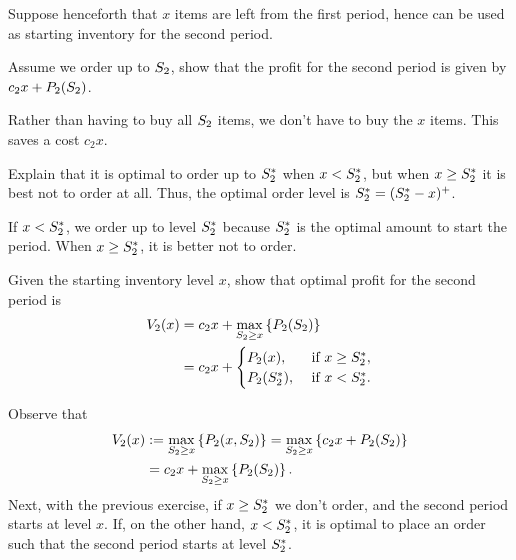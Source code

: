 Suppose henceforth that $x$ items are left from the first period, hence can be used as starting inventory for the second period.
  
\begin{exercise}
Assume we order up to $S_2$,  show that the profit for the second period is given by
$c_2 x + P_2(S_2)$.
\begin{solution}
Rather than having to buy all $S_2$ items, we don't have to buy the $x$ items. This saves a cost $c_2 x$. 
\end{solution}
\end{exercise}

\begin{exercise}
Explain that it is optimal to order up to $S_2^*$ when $x<S_2^*$, but when $x\geq 
S_2^*$ it is best not to order at all. Thus, the optimal order level is $S_2^* = (S_2^* - x)^+$.  
\begin{solution}
If $x<S_2^*$, we order up to level $S_2^*$ because $S_2^*$ is the optimal amount to start the period. When $x\geq S_2^*$, it is better not to order. 
\end{solution}
\end{exercise}

\begin{exercise}
Given the starting inventory level $x$, show that optimal profit for the second period is
\begin{align}\label{eq:24}
V_2(x) & = c_2x + \max_{S_2\geq x} \left\{P_2(S_2)\right\} \notag \\
&= c_2x +
  \begin{cases}
    P_2(x), &\text{ if } x\geq S_2^*, \\
    P_2(S_2^*), &\text{ if } x<S_2^*.
  \end{cases}
\end{align}
\begin{solution} Observe that
\begin{align*}
V_2(x) 
&:=\max_{S_2\geq x} \left\{P_2(x,S_2)\right\} 
= \max_{S_2\geq x} \left\{c_2x + P_2(S_2)\right\} \\
& = c_2x + \max_{S_2\geq x} \left\{P_2(S_2)\right\}.
\end{align*}
Next, with the previous exercise, if $x\geq S_2^*$ we don't order, and the second period starts at level $x$. If, on the other hand, $x<S_2^*$, it is optimal to place an order such that the second period starts at level $S_2^*$.
\end{solution}
\end{exercise}

